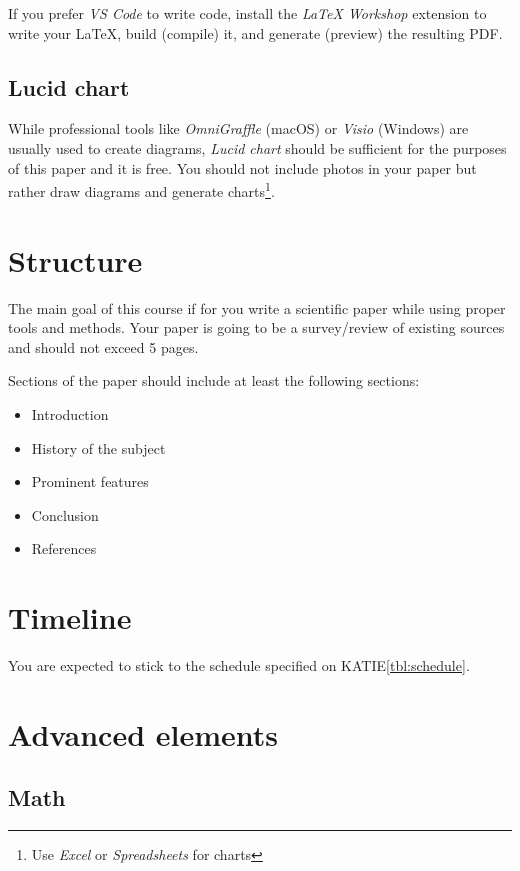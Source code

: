 \documentclass[11pt]{sigplanconf}
\begin{document}
If you prefer \textit{VS Code} to write code, install the \textit{LaTeX Workshop} extension to write your \LaTeX, build (compile) it, and generate (preview) the resulting PDF.

\subsection{Lucid chart}

While professional tools like \textit{OmniGraffle} (macOS) or \textit{Visio} (Windows) are usually used to create diagrams, \textit{Lucid chart}\cite{OnlineDi2:online} should be sufficient for the purposes of this paper and it is free. You should not include photos in your paper but rather draw diagrams and generate charts\footnote{Use \textit{Excel} or \textit{Spreadsheets} for charts}.

\section{Structure}

The main goal of this course if for you write a scientific paper while using proper tools and methods. Your paper is going to be a survey/review of existing sources and should not exceed 5 pages.

Sections of the paper should include at least the following sections:

\begin{itemize}
    \item Introduction
    \item History of the subject
    \item Prominent features
    \item Conclusion
    \item References
\end{itemize}

\section{Timeline}

You are expected to stick to the schedule specified on KATIE\ref{tbl:schedule}.

\section{Advanced elements}

\subsection{Math}
\end{document}

